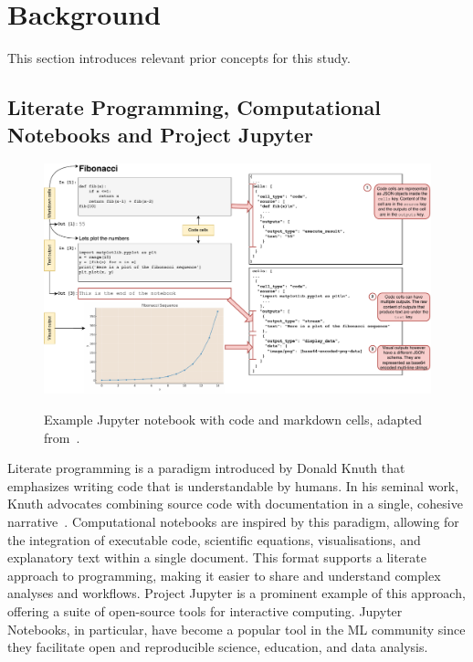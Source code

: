 

\section{Background}\label{sec:background}

This section introduces relevant prior concepts for this study.

\subsection{Literate Programming, Computational Notebooks and Project Jupyter}


\begin{figure}
  \centering
  \includegraphics[width=\linewidth]{nb.pdf}
  \label{fig:nb}
  \caption{Example Jupyter notebook with code and markdown cells, adapted from~\cite[Figure~1]{pimentel2019large-scale}.}
\end{figure}

Literate programming is a paradigm introduced by Donald Knuth that emphasizes writing code that is understandable by humans. In his seminal work, Knuth advocates combining source code with documentation in a single, cohesive narrative~\cite{knuth1984literate}. Computational notebooks are inspired by this paradigm, allowing for the integration of executable code, scientific equations, visualisations, and explanatory text within a single document. This format supports a literate approach to programming, making it easier to share and understand complex analyses and workflows. Project Jupyter is a prominent example of this approach, offering a suite of open-source tools for interactive computing. Jupyter Notebooks, in particular, have become a popular tool in the ML community since they facilitate open and reproducible science, education, and data analysis.

